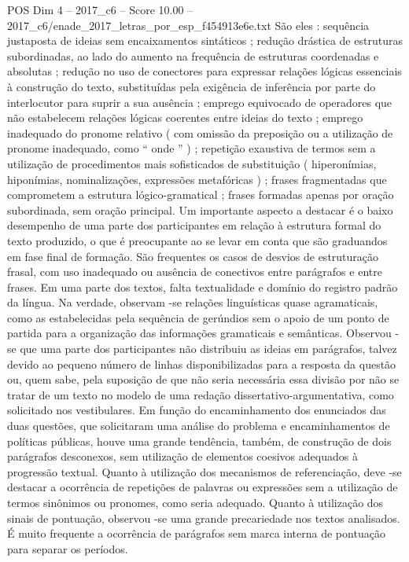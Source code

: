 \begin{textsample}{POS Dim 4 – 2017\_c6 – Score 10.00 – 2017\_c6/enade\_2017\_letras\_por\_esp\_f454913e6e.txt}
São eles : sequência justaposta de ideias sem encaixamentos sintáticos ; redução drástica de estruturas subordinadas, ao lado do aumento na frequência de estruturas coordenadas e absolutas ; redução no uso de conectores para expressar relações lógicas essenciais à construção do texto, substituídas pela exigência de inferência por parte do interlocutor para suprir a sua ausência ; emprego equivocado de operadores que não estabelecem relações lógicas coerentes entre ideias do texto ; emprego inadequado do pronome relativo ( com omissão da preposição ou a utilização de pronome inadequado, como “ onde ” ) ; repetição exaustiva de termos sem a utilização de procedimentos mais sofisticados de substituição ( hiperonímias, hiponímias, nominalizações, expressões metafóricas ) ; frases fragmentadas que comprometem a estrutura lógico-gramatical ; frases formadas apenas por oração subordinada, sem oração principal.
Um importante aspecto a destacar é o baixo desempenho de uma parte dos participantes em relação à estrutura formal do texto produzido, o que é preocupante ao se levar em conta que são graduandos em fase final de formação.
São frequentes os casos de desvios de estruturação frasal, com uso inadequado ou ausência de conectivos entre parágrafos e entre frases.
Em uma parte dos textos, falta textualidade e domínio do registro padrão da língua.
Na verdade, observam -se relações linguísticas quase agramaticais, como as estabelecidas pela sequência de gerúndios sem o apoio de um ponto de partida para a organização das informações gramaticais e semânticas.
Observou -se que uma parte dos participantes não distribuiu as ideias em parágrafos, talvez devido ao pequeno número de linhas disponibilizadas para a resposta da questão ou, quem sabe, pela suposição de que não seria necessária essa divisão por não se tratar de um texto no modelo de uma redação dissertativo-argumentativa, como solicitado nos vestibulares.
Em função do encaminhamento dos enunciados das duas questões, que solicitaram uma análise do problema e encaminhamentos de políticas públicas, houve uma grande tendência, também, de construção de dois parágrafos desconexos, sem utilização de elementos coesivos adequados à progressão textual.
Quanto à utilização dos mecanismos de referenciação, deve -se destacar a ocorrência de repetições de palavras ou expressões sem a utilização de termos sinônimos ou pronomes, como seria adequado.
Quanto à utilização dos sinais de pontuação, observou -se uma grande precariedade nos textos analisados.
É muito frequente a ocorrência de parágrafos sem marca interna de pontuação para separar os períodos.

\end{textsample}
